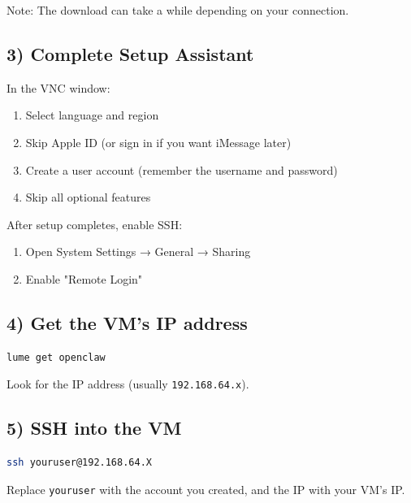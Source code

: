 Note: The download can take a while depending on your connection.

\hrulefill


\subsection{3) Complete Setup Assistant}


In the VNC window:

\begin{enumerate}
  \item Select language and region
  \item Skip Apple ID (or sign in if you want iMessage later)
  \item Create a user account (remember the username and password)
  \item Skip all optional features
\end{enumerate}


After setup completes, enable SSH:

\begin{enumerate}
  \item Open System Settings → General → Sharing
  \item Enable "Remote Login"
\end{enumerate}


\hrulefill


\subsection{4) Get the VM's IP address}


\begin{lstlisting}[language=bash]
lume get openclaw
\end{lstlisting}


Look for the IP address (usually \texttt{192.168.64.x}).

\hrulefill


\subsection{5) SSH into the VM}


\begin{lstlisting}[language=bash]
ssh youruser@192.168.64.X
\end{lstlisting}


Replace \texttt{youruser} with the account you created, and the IP with your VM's IP.

\hrulefill


